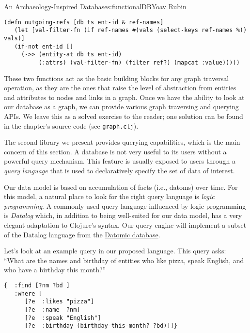 \begin{aosachapter}{An Archaeology-Inspired Database}{s:functionalDB}{Yoav Rubin}
\begin{verbatim}
(defn outgoing-refs [db ts ent-id & ref-names]
   (let [val-filter-fn (if ref-names #(vals (select-keys ref-names %)) vals)]
   (if-not ent-id []
     (->> (entity-at db ts ent-id)
          (:attrs) (val-filter-fn) (filter ref?) (mapcat :value)))))
\end{verbatim}

These two functions act as the basic building blocks for any graph
traversal operation, as they are the ones that raise the level of
abstraction from entities and attributes to nodes and links in a graph.
Once we have the ability to look at our database as a graph, we can
provide various graph traversing and querying APIs. We leave this as a
solved exercise to the reader; one solution can be found in the
chapter's source code (see \texttt{graph.clj}).

\label{querying-the-database}

The second library we present provides querying capabilities, which is
the main concern of this section. A database is not very useful to its
users without a powerful query mechanism. This feature is usually
exposed to users through a \emph{query language} that is used to
declaratively specify the set of data of interest.

Our data model is based on accumulation of facts (i.e., datoms) over
time. For this model, a natural place to look for the right query
language is \emph{logic programming}. A commonly used query language
influenced by logic programming is \emph{Datalog} which, in addition to
being well-suited for our data model, has a very elegant adaptation to
Clojure's syntax. Our query engine will implement a subset of the
Datalog language from the
\href{http://docs.datomic.com/query.html}{Datomic database}.

\label{query-language}

Let's look at an example query in our proposed language. This query
asks: ``What are the names and birthday of entities who like pizza,
speak English, and who have a birthday this month?''

\begin{verbatim}
{  :find [?nm ?bd ]
   :where [
      [?e  :likes "pizza"]
      [?e  :name  ?nm] 
      [?e  :speak "English"]
      [?e  :birthday (birthday-this-month? ?bd)]]}
\end{verbatim}

\label{syntax}


\end{aosachapter}
